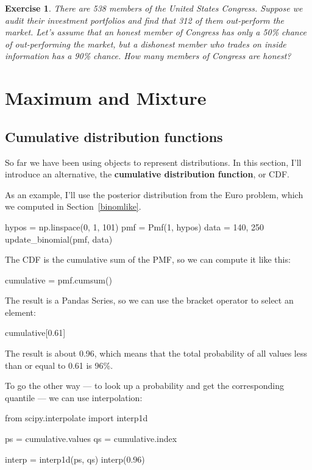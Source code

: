 \documentclass[12pt]{book}
\theoremstyle{exercise}
\newtheorem{exercise}{Exercise}[chapter]
\begin{document}
\begin{exercise}
There are 538 members of the United States Congress.  
Suppose we audit their investment portfolios and find that 312 of them out-perform the market.
Let's assume that an honest member of Congress has only a 50\% chance of out-performing the market, but a dishonest member who trades on inside information has a 90\% chance.  How many members of Congress are honest?
\end{exercise}



\chapter{Maximum and Mixture}

\section{Cumulative distribution functions}

So far we have been using  objects to represent distributions.
In this section, I'll introduce an alternative, the {\bf cumulative distribution function}, or CDF.

As an example, I'll use the posterior distribution from the Euro problem, which we computed in Section~\ref{binomlike}.

\begin{code}
hypos = np.linspace(0, 1, 101)
pmf = Pmf(1, hypos)
data = 140, 250
update_binomial(pmf, data)
\end{code}

The CDF is the cumulative sum of the PMF, so we can compute it like this:

\begin{code}
cumulative = pmf.cumsum()
\end{code}

The result is a Pandas Series, so we can use the bracket operator to select an element:

\begin{code}
cumulative[0.61]
\end{code}

The result is about 0.96, which means that the total probability of all values less than or equal to 0.61 is 96\%.

To go the other way --- to look up a probability and get the corresponding quantile --- we can use interpolation:

\begin{code}
from scipy.interpolate import interp1d

ps = cumulative.values
qs = cumulative.index

interp = interp1d(ps, qs)
interp(0.96)
\end{code}
\end{document}
